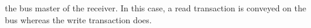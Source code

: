 \documentclass{llncs}
\begin{document}
\begin{subappendices}
\begin{itemize}
	the bus master of the receiver. In this case, a read transaction is conveyed on the bus whereas the write
	transaction does.
\end{itemize}
%
%

\end{subappendices}
\end{document}

